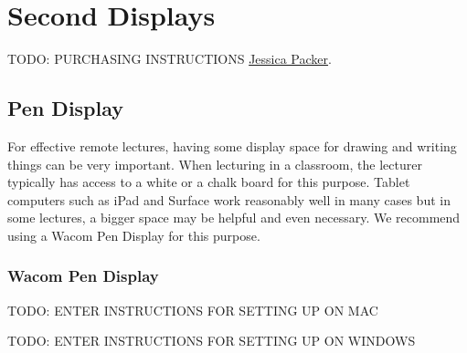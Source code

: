 \chapter{Second Displays}
\label{ch:displays}

\begin{gram}
\label{grm:displays::preamble}
TODO: PURCHASING INSTRUCTIONS
\href{mailto:jpacker@andrew.cmu.edu}{Jessica Packer}.
%
\end{gram}


\section{Pen Display}

For effective remote lectures, having some display space for drawing and writing things can be very important.  When lecturing in a classroom, the lecturer typically has access to a white or a chalk  board for this purpose.  
%
Tablet computers such as iPad and Surface work reasonably well in many cases but in some lectures, a bigger space may be helpful and even necessary. 
%
We recommend using a Wacom Pen Display for this purpose.

\subsection{Wacom Pen Display}
\label{sec:displays::wacom}


\begin{gram}
\label{grm:displays::wacom::16::mac-setup}

TODO: ENTER INSTRUCTIONS FOR SETTING UP ON MAC
\end{gram}


\begin{gram}
\label{grm:displays::wacom::16::win-setup}

TODO: ENTER INSTRUCTIONS FOR SETTING UP ON WINDOWS
\end{gram}


